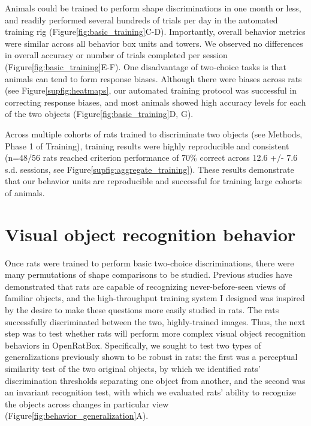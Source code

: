 Animals could be trained to perform shape discriminations in one month or less, and readily performed several hundreds of trials per day in the automated training rig (Figure\ref{fig:basic_training}C-D). Importantly, overall behavior metrics were similar across all behavior box units and towers. We observed no differences in overall accuracy or number of trials completed per session (Figure\ref{fig:basic_training}E-F). One disadvantage of two-choice tasks is that animals can tend to form response biases. Although there were biases across rats (see Figure\ref{supfig:heatmaps}, our automated training protocol was successful in correcting response biases, and most animals showed high accuracy levels for each of the two objects (Figure\ref{fig:basic_training}D, G). 

Across multiple cohorts of rats trained to discriminate two objects (see Methods, Phase 1 of Training), training results were highly reproducible and consistent (n=48/56 rats reached criterion performance of 70\% correct across 12.6 +/- 7.6 s.d. sessions, see Figure\ref{supfig:aggregate_training}). These results demonstrate that our behavior units are reproducible and successful for training large cohorts of animals. 

\section{Visual object recognition behavior}
Once rats were trained to perform basic two-choice discriminations, there were many permutations of shape comparisons to be studied. Previous studies have demonstrated that rats are capable of recognizing never-before-seen views of familiar objects\cite{Zoccolan2009, Vermaercke2012, Tafazoli2012}, and the high-throughput training system I designed was inspired by the desire to make these questions more easily studied in rats. The rats successfully discriminated between the two, highly-trained images. Thus, the next step was to test whether rats will perform more complex visual object recognition behaviors in OpenRatBox. Specifically, we sought to test two types of generalizations previously shown to be robust in rats\cite{Zoccolan2009, Tafazoli2012}: the first was a perceptual similarity test of the two original objects, by which we identified rats’ discrimination thresholds separating one object from another, and the second was an invariant recognition test, with which we evaluated rats' ability to recognize the objects across changes in particular view (Figure\ref{fig:behavior_generalization}A). 

